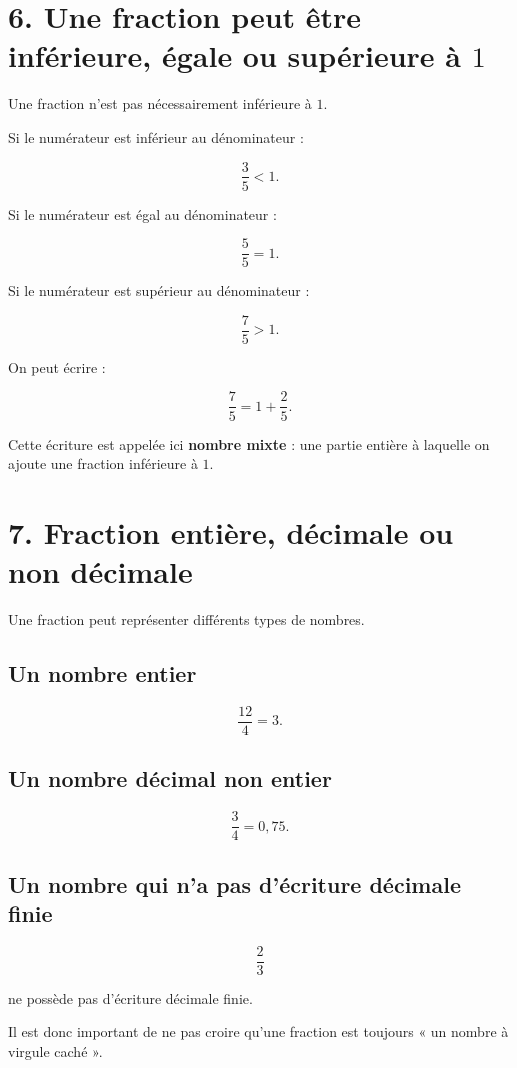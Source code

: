 \section{6. Une fraction peut être inférieure, égale ou supérieure à $1$}

Une fraction n’est pas nécessairement inférieure à $1$.

Si le numérateur est inférieur au dénominateur :

\[
\dfrac{3}{5}<1.
\]

Si le numérateur est égal au dénominateur :

\[
\dfrac{5}{5}=1.
\]

Si le numérateur est supérieur au dénominateur :

\[
\dfrac{7}{5}>1.
\]

On peut écrire :

\[
\dfrac{7}{5}=1+\dfrac{2}{5}.
\]

Cette écriture est appelée ici \textbf{nombre mixte} : une partie entière à laquelle on ajoute une fraction inférieure à $1$.

\section{7. Fraction entière, décimale ou non décimale}

Une fraction peut représenter différents types de nombres.

\subsection{Un nombre entier}

\[
\dfrac{12}{4}=3.
\]

\subsection{Un nombre décimal non entier}

\[
\dfrac{3}{4}=0{,}75.
\]

\subsection{Un nombre qui n’a pas d’écriture décimale finie}

\[
\dfrac{2}{3}
\]

ne possède pas d’écriture décimale finie.

Il est donc important de ne pas croire qu’une fraction est toujours « un nombre à virgule caché ».

